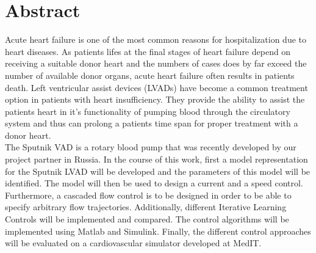 \chapter{Abstract}

Acute heart failure is one of the most common reasons for hospitalization due to heart diseases. As patients lifes at the final stages of heart failure depend on receiving a suitable donor heart and the numbers of cases does by far exceed the number of available donor organs, acute heart failure often results in patients death. Left ventricular assist devices (LVADs) have become a common treatment option in patients with heart insufficiency. They provide the ability to assist the patients heart in it's functionality of pumping blood through the circulatory system and thus can prolong a patients time span for proper treatment with a donor heart.
\\
The Sputnik VAD is a rotary blood pump that was recently developed by our project partner in Russia. In the course of this work,  first a model representation for the Sputnik LVAD will be developed and the parameters of this model will be identified. The model will then be used to design a current and a speed control. Furthermore, a cascaded flow control is to be designed in order to be able to specify arbitrary flow trajectories. Additionally, different Iterative Learning Controls will be implemented and compared. The control algorithms will be implemented using Matlab and Simulink. Finally, the different control approaches will be evaluated on a cardiovascular simulator developed at MedIT.



\cleardoubleemptypage
\thispagestyle{empty}

